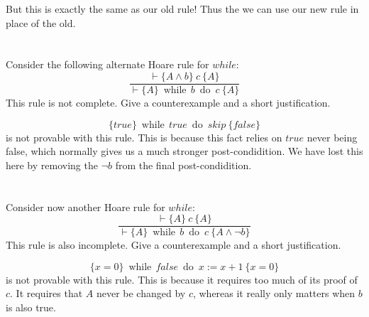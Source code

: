\documentclass{article}
\newcommand{\problem}[1]
{\subsubsection*{} %
\vspace{-16pt} \section{} \vspace{-22pt} \qquad
#1%
\bigskip \bigskip
}
\newcommand{\while}[2]{\operatorname{while}\, #1\ \operatorname{do}\ #2}
\newcommand{\proves}{\vdash}
\newcommand{\axiomatic}[3]{\{#1\}\ #2\ \{#3\}}
\begin{document}
But this is exactly the same as our old rule! Thus the we can use our new rule
in place of the old.


 \problem{Consider the following alternate Hoare rule for
$while$:
\[
\frac{\proves \axiomatic{A \wedge b}{c}{A}}
{\proves \axiomatic{A}{\while{b}{c}}{A}}
\]
This rule is not complete. Give a counterexample and a short justification.
}

\[\axiomatic{true}{\while{true}{skip}}{false}\] is not provable with this rule. 
This is because this fact relies on $true$ never being false, which normally
gives us a much stronger post-condidition.  We have lost this here by removing
the $\neg b$ from the final post-condidition.

\problem{Consider now another Hoare rule for $while$:
\[
\frac{\proves \axiomatic{A}{c}{A}}
{\proves \axiomatic{A}{\while{b}{c}}{A \wedge \neg b}}
\]
This rule is also incomplete. Give a counterexample and a short justification.
}

\[\axiomatic{x=0}{\while{false}{x:=x+1}}{x=0}\] is not provable with this rule.
This is because it requires too much of its proof of $c$.  It requires that 
$A$ never be changed by $c$, whereas it really only matters when $b$ is also
true.
\end{document}

